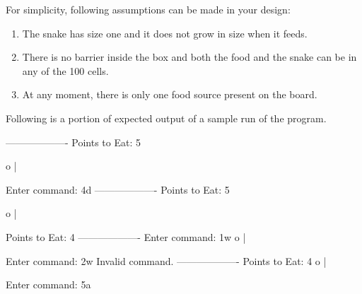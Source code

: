 For simplicity, following assumptions can be made in your design:
\begin{enumerate}[itemsep=0mm,rightmargin=\leftmargin]
  \item The snake has size one and it does not grow in size when it feeds.
  \item There is no barrier inside the box and both the food and the snake can be in any of the 100 cells.
  \item At any moment, there is only one food source present on the board.
\end{enumerate}

Following is a portion of expected output of a sample run of the program.

\begin{terminal}
-------------------
Points to Eat: 5

       o
   |


Enter command: 4d
-------------------
Points to Eat: 5

       o
       |


Points to Eat: 4
-------------------
Enter command: 1w
  o
       |



Enter command: 2w
Invalid command.
-------------------
Points to Eat: 4
  o
       |



Enter command: 5a
\end{terminal}
